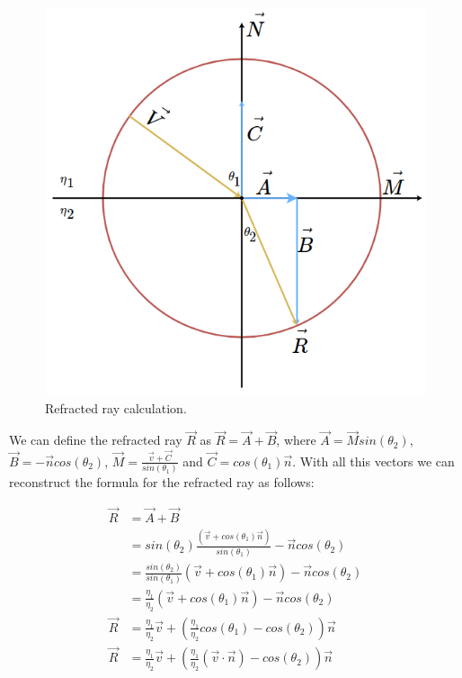 \documentclass[titlepage,12pt]{report}
\begin{document}
\begin{figure}[H]
	\centering
	\includegraphics[scale=0.45]{media/refraction_unit_sphere.png}
	\caption{Refracted ray calculation.}
	\label{snell2}
\end{figure}

We can define the refracted ray $\vec{R}$ as $\vec{R} = \vec{A} + \vec{B}$, where $\vec{A} = \vec{M} sin(\theta_2)$, $\vec{B} = -\vec{n} cos(\theta_2)$, $\vec{M} = \frac{\vec{v}+\vec{C}}{sin(\theta_1)}$ and $\vec{C} = cos(\theta_1)\vec{n}$. With all this vectors we can reconstruct the formula for the refracted ray as follows:

\begin{equation} \label{refracted_ray}
\begin{split}
\vec{R} & = \vec{A} + \vec{B} \\
 & = sin(\theta_2) \frac{\left(\vec{v} + cos(\theta_1)\vec{n}\right)}{sin(\theta_1)} - \vec{n} cos(\theta_2) \\
 & = \frac{sin(\theta_2)}{sin(\theta_1)} \left(\vec{v} + cos(\theta_1)\vec{n}\right) - \vec{n} cos(\theta_2) \\
 & = \frac{\eta_1}{\eta_2} \left(\vec{v} + cos(\theta_1)\vec{n}\right) - \vec{n} cos(\theta_2) \\
\vec{R} & = \frac{\eta_1}{\eta_2} \vec{v} + \left(\frac{\eta_1}{\eta_2} cos(\theta_1) - cos(\theta_2) \right) \vec{n} \\
\vec{R} & = \frac{\eta_1}{\eta_2} \vec{v} + \left(\frac{\eta_1}{\eta_2} (\vec{v} \cdot \vec{n}) - cos(\theta_2) \right) \vec{n} \\
\end{split}
\end{equation}
\end{document}
